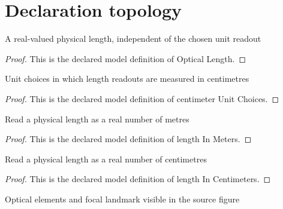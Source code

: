 \section{Declaration topology}
\begin{definition}
  \label{def:physics:phyx-mini-0108:phyxminiproblems-problemphyxmini0108-opticallength}
  A real-valued physical length, independent of the chosen unit readout
\end{definition}
\begin{proof}
  This is the declared model definition of Optical Length.
\end{proof}
\begin{definition}
  \label{def:physics:phyx-mini-0108:phyxminiproblems-problemphyxmini0108-centimeterunitchoices}
  Unit choices in which length readouts are measured in centimetres
\end{definition}
\begin{proof}
  This is the declared model definition of centimeter Unit Choices.
\end{proof}
\begin{definition}
  \label{def:physics:phyx-mini-0108:phyxminiproblems-problemphyxmini0108-lengthinmeters}
  Read a physical length as a real number of metres
\end{definition}
\begin{proof}
  This is the declared model definition of length In Meters.
\end{proof}
\begin{definition}
  \label{def:physics:phyx-mini-0108:phyxminiproblems-problemphyxmini0108-lengthincentimeters}
  Read a physical length as a real number of centimetres
\end{definition}
\begin{proof}
  This is the declared model definition of length In Centimeters.
\end{proof}
\begin{definition}
  \label{def:physics:phyx-mini-0108:phyxminiproblems-problemphyxmini0108-figurelandmark}
  Optical elements and focal landmark visible in the source figure
\end{definition}

